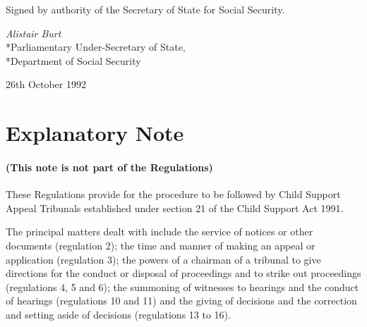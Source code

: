 \documentclass[12pt,a4paper]{article}
\begin{document}

\bigskip

Signed by authority of the Secretary of State for Social Security.

{\raggedleft
\emph{Alistair Burt}\\*Parliamentary Under-Secretary of State,\\*Department of Social Security

}

26th October 1992

\small

\part{Explanatory Note}

\renewcommand\parthead{--- Explanatory Note}

\subsection*{(This note is not part of the Regulations)}

 These Regulations provide for the procedure to be followed by Child Support Appeal Tribunals established under section 21 of the Child Support Act 1991.

  The principal matters dealt with include the service of notices or other documents (regulation 2); the time and manner of making an appeal or application (regulation 3); the powers of a chairman of a tribunal to give directions for the conduct or disposal of proceedings and to strike out proceedings (regulations 4, 5 and 6); the summoning of witnesses to hearings and the conduct of hearings (regulations 10 and 11) and the giving of decisions and the correction and setting aside of decisions (regulations 13 to 16).
\end{document}
